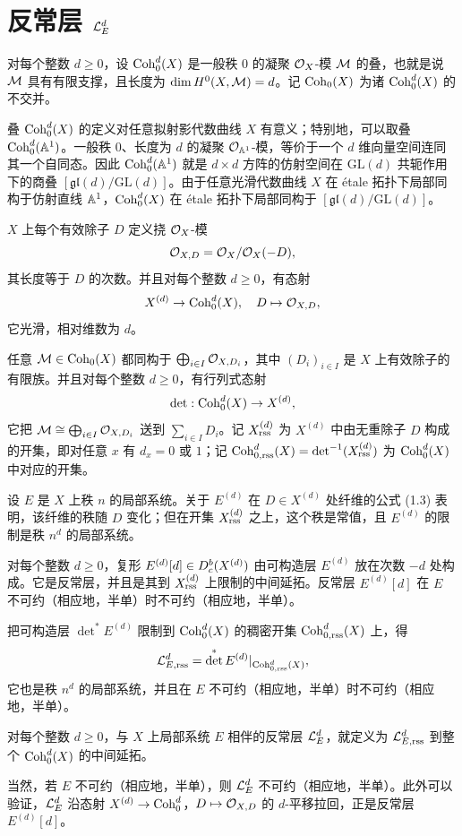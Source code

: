 \section{反常层 $\mathcal{L}^d_E$}

对每个整数 $d\ge 0$，设 $\operatorname{Coh}^d_0(X)$ 是一般秩 $0$ 的凝聚 $\mathcal{O}_X$-模 $\mathcal{M}$ 的叠，也就是说 $\mathcal{M}$ 具有有限支撑，且长度为 $\dim H^0(X,\mathcal{M})=d$。记 $\operatorname{Coh}_0(X)$ 为诸 $\operatorname{Coh}^d_0(X)$ 的不交并。

叠 $\operatorname{Coh}^d_0(X)$ 的定义对任意拟射影代数曲线 $X$ 有意义；特别地，可以取叠 $\operatorname{Coh}^d_0(\mathbb{A}^1)$。一般秩 $0$、长度为 $d$ 的凝聚 $\mathcal{O}_{\mathbb{A}^1}$-模，等价于一个 $d$ 维向量空间连同其一个自同态。因此 $\operatorname{Coh}^d_0(\mathbb{A}^1)$ 就是 $d\times d$ 方阵的仿射空间在 $\mathrm{GL}(d)$ 共轭作用下的商叠 $[\mathfrak{gl}(d)/\mathrm{GL}(d)]$。由于任意光滑代数曲线 $X$ 在 étale 拓扑下局部同构于仿射直线 $\mathbb{A}^1$，$\operatorname{Coh}^d_0(X)$ 在 étale 拓扑下局部同构于 $[\mathfrak{gl}(d)/\mathrm{GL}(d)]$。

$X$ 上每个有效除子 $D$ 定义挠 $\mathcal{O}_X$-模
\[
  \mathcal{O}_{X,D} = \mathcal{O}_X/\mathcal{O}_X(-D),
\]
其长度等于 $D$ 的次数。并且对每个整数 $d\ge 0$，有态射
\[
  X^{(d)} \to \operatorname{Coh}^d_0(X),\quad D\mapsto \mathcal{O}_{X,D},
\]
它光滑，相对维数为 $d$。

任意 $\mathcal{M}\in\operatorname{Coh}_0(X)$ 都同构于 $\bigoplus_{i\in I}\mathcal{O}_{X,D_i}$，其中 $(D_i)_{i\in I}$ 是 $X$ 上有效除子的有限族。并且对每个整数 $d\ge 0$，有行列式态射
\[
  \det : \operatorname{Coh}^d_0(X) \to X^{(d)},
\]
它把 $\mathcal{M}\cong\bigoplus_{i\in I}\mathcal{O}_{X,D_i}$ 送到 $\sum_{i\in I}D_i$。记 $X^{(d)}_{\mathrm{rss}}$ 为 $X^{(d)}$ 中由无重除子 $D$ 构成的开集，即对任意 $x$ 有 $d_x=0$ 或 $1$；记 $\operatorname{Coh}^d_{0,\mathrm{rss}}(X)=\det^{-1}(X^{(d)}_{\mathrm{rss}})$ 为 $\operatorname{Coh}^d_0(X)$ 中对应的开集。

设 $E$ 是 $X$ 上秩 $n$ 的局部系统。关于 $E^{(d)}$ 在 $D\in X^{(d)}$ 处纤维的公式 (1.3) 表明，该纤维的秩随 $D$ 变化；但在开集 $X^{(d)}_{\mathrm{rss}}$ 之上，这个秩是常值，且 $E^{(d)}$ 的限制是秩 $n^d$ 的局部系统。

\begin{lemma}
对每个整数 $d\ge 0$，复形 $E^{(d)}[d]\in D^{b}_{c}(X^{(d)})$ 由可构造层 $E^{(d)}$ 放在次数 $-d$ 处构成。它是反常层，并且是其到 $X^{(d)}_{\mathrm{rss}}$ 上限制的中间延拓。反常层 $E^{(d)}[d]$ 在 $E$ 不可约（相应地，半单）时不可约（相应地，半单）。
\end{lemma}

把可构造层 $\det^* E^{(d)}$ 限制到 $\operatorname{Coh}^d_0(X)$ 的稠密开集 $\operatorname{Coh}^d_{0,\mathrm{rss}}(X)$ 上，得
\[
  \mathcal{L}^d_{E,\mathrm{rss}} = \det^* E^{(d)}|_{\operatorname{Coh}^d_{0,\mathrm{rss}}(X)},
\]
它也是秩 $n^d$ 的局部系统，并且在 $E$ 不可约（相应地，半单）时不可约（相应地，半单）。

\begin{definition}
对每个整数 $d\ge 0$，与 $X$ 上局部系统 $E$ 相伴的反常层 $\mathcal{L}^d_E$，就定义为 $\mathcal{L}^d_{E,\mathrm{rss}}$ 到整个 $\operatorname{Coh}^d_0(X)$ 的中间延拓。
\end{definition}

当然，若 $E$ 不可约（相应地，半单），则 $\mathcal{L}^d_E$ 不可约（相应地，半单）。此外可以验证，$\mathcal{L}^d_E$ 沿态射 $X^{(d)}\to\operatorname{Coh}^d_0$，$D\mapsto\mathcal{O}_{X,D}$ 的 $d$-平移拉回，正是反常层 $E^{(d)}[d]$。
